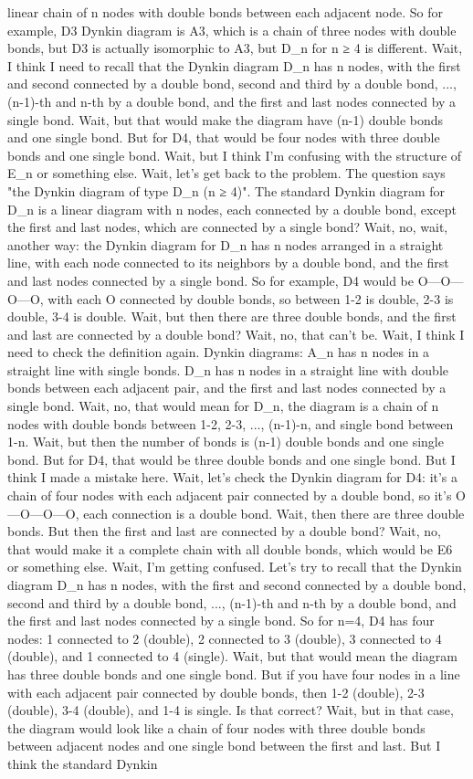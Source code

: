 linear chain of n nodes with double bonds between each adjacent node. So for example, D3 Dynkin diagram is A3, which is a chain of three nodes with double bonds, but D3 is actually isomorphic to A3, but D_n for n ≥ 4 is different. Wait, I think I need to recall that the Dynkin diagram D_n has n nodes, with the first and second connected by a double bond, second and third by a double bond, ..., (n-1)-th and n-th by a double bond, and the first and last nodes connected by a single bond. Wait, but that would make the diagram have (n-1) double bonds and one single bond. But for D4, that would be four nodes with three double bonds and one single bond. Wait, but I think I'm confusing with the structure of E_n or something else. Wait, let's get back to the problem. The question says "the Dynkin diagram of type D_n (n ≥ 4)". The standard Dynkin diagram for D_n is a linear diagram with n nodes, each connected by a double bond, except the first and last nodes, which are connected by a single bond? Wait, no, wait, another way: the Dynkin diagram for D_n has n nodes arranged in a straight line, with each node connected to its neighbors by a double bond, and the first and last nodes connected by a single bond. So for example, D4 would be O---O---O---O, with each O connected by double bonds, so between 1-2 is double, 2-3 is double, 3-4 is double. Wait, but then there are three double bonds, and the first and last are connected by a double bond? Wait, no, that can't be. Wait, I think I need to check the definition again. Dynkin diagrams: A_n has n nodes in a straight line with single bonds. D_n has n nodes in a straight line with double bonds between each adjacent pair, and the first and last nodes connected by a single bond. Wait, no, that would mean for D_n, the diagram is a chain of n nodes with double bonds between 1-2, 2-3, ..., (n-1)-n, and single bond between 1-n. Wait, but then the number of bonds is (n-1) double bonds and one single bond. But for D4, that would be three double bonds and one single bond. But I think I made a mistake here. Wait, let's check the Dynkin diagram for D4: it's a chain of four nodes with each adjacent pair connected by a double bond, so it's O---O---O---O, each connection is a double bond. Wait, then there are three double bonds. But then the first and last are connected by a double bond? Wait, no, that would make it a complete chain with all double bonds, which would be E6 or something else. Wait, I'm getting confused. Let's try to recall that the Dynkin diagram D_n has n nodes, with the first and second connected by a double bond, second and third by a double bond, ..., (n-1)-th and n-th by a double bond, and the first and last nodes connected by a single bond. So for n=4, D4 has four nodes: 1 connected to 2 (double), 2 connected to 3 (double), 3 connected to 4 (double), and 1 connected to 4 (single). Wait, but that would mean the diagram has three double bonds and one single bond. But if you have four nodes in a line with each adjacent pair connected by double bonds, then 1-2 (double), 2-3 (double), 3-4 (double), and 1-4 is single. Is that correct? Wait, but in that case, the diagram would look like a chain of four nodes with three double bonds between adjacent nodes and one single bond between the first and last. But I think the standard Dynkin 
